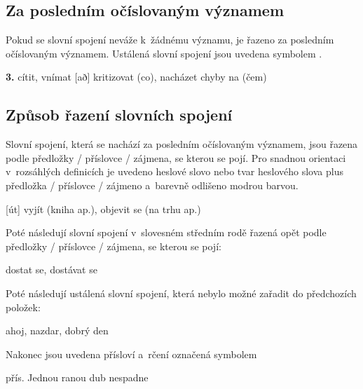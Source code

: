 \subsection*{Za posledním očíslovaným významem}

Pokud se slovní spojení neváže k~žádnému významu, je řazeno za posledním očíslovaným významem. Ustálená slovní spojení jsou uvedena symbolem \dicsymIdiom.

\blspace
  \dicEntry {}   {\textbf{3.}} {cítit, vnímat} [að] {} {kritizovat (co), nacházet chyby na (čem)}
\blspace

\subsection*{Způsob řazení slovních spojení}

Slovní spojení, která se nachází za posledním očíslovaným významem, jsou řazena podle předložky / příslovce / zájmena, se kterou se pojí. Pro snadnou orientaci v~rozsáhlých definicích je uvedeno heslové slovo nebo tvar heslového slova plus předložka / příslovce / zájmeno a~barevně odlišeno modrou barvou.

\blspace
  \dicEntry {}   [út] {} {vyjít (kniha ap.), objevit se (na trhu ap.)}
\blspace

Poté následují slovní spojení v~slovesném středním rodě řazená opět podle předložky / příslovce / zájmena, se kterou se pojí:

\blspace
  \dicEntry {}    {}  {dostat se, dostávat se}
\blspace

Poté následují ustálená slovní spojení, která nebylo možné zařadit do předchozích položek:

\blspace
  \dicEntry {}    {} {ahoj, nazdar, dobrý den}
\blspace

Nakonec jsou uvedena přísloví a~rčení označená symbolem \dicsymProverb\:

\blspace
  \dicEntry {}   \dicProverb{}  {\footnotesize{přís.}} {Jednou ranou dub nespadne}
\blspace

